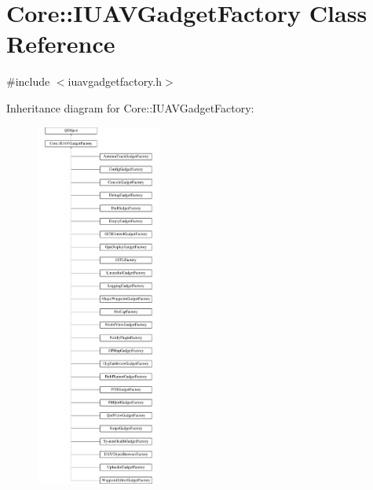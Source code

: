\hypertarget{class_core_1_1_i_u_a_v_gadget_factory}{\section{Core\-:\-:I\-U\-A\-V\-Gadget\-Factory Class Reference}
\label{class_core_1_1_i_u_a_v_gadget_factory}
}


{\ttfamily \#include $<$iuavgadgetfactory.\-h$>$}

Inheritance diagram for Core\-:\-:I\-U\-A\-V\-Gadget\-Factory\-:\begin{figure}[H]
\begin{center}
\leavevmode
\includegraphics[height=12.000000cm]{class_core_1_1_i_u_a_v_gadget_factory}
\end{center}
\end{figure}
